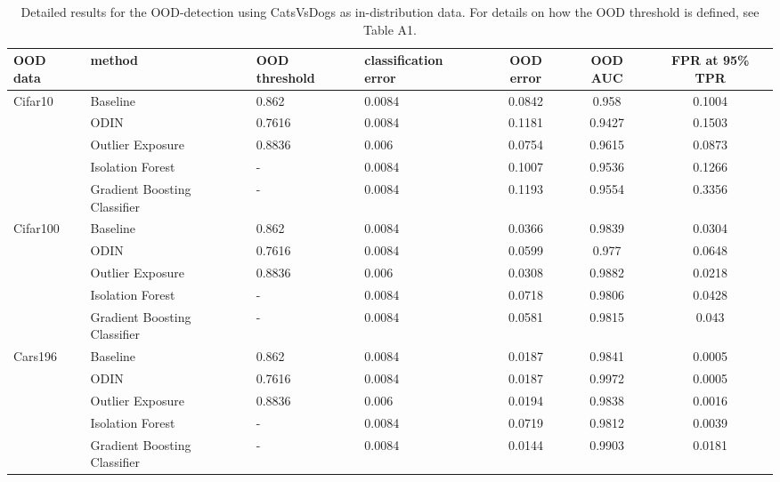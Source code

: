 \documentclass{article}
\begin{document}
 \begin{table}[h]
    \centering
    \caption{Detailed results for the OOD-detection using CatsVsDogs as in-distribution data. For details on how the OOD threshold is defined, see Table A1.}
\begin{tabular}{lllHccc}
\toprule
            OOD data & method                              & OOD threshold & classification error & OOD error & OOD AUC & FPR at 95\% TPR \\
\toprule
Cifar10 & Baseline &         0.862 &               0.0084 &    0.0842 &   0.958 &         0.1004 \\
            & ODIN &        0.7616 &               0.0084 &    0.1181 &  0.9427 &         0.1503 \\
            & Outlier Exposure &        0.8836 &                0.006 &    0.0754 &  0.9615 &         0.0873 \\
            & Isolation Forest &             - &               0.0084 &    0.1007 &  0.9536 &         0.1266 \\
            & Gradient Boosting Classifier &             - &               0.0084 &    0.1193 &  0.9554 &         0.3356 \\
\midrule
Cifar100 & Baseline &         0.862 &               0.0084 &    0.0366 &  0.9839 &         0.0304 \\
            & ODIN &        0.7616 &               0.0084 &    0.0599 &   0.977 &         0.0648 \\
            & Outlier Exposure &        0.8836 &                0.006 &    0.0308 &  0.9882 &         0.0218 \\
            & Isolation Forest &             - &               0.0084 &    0.0718 &  0.9806 &         0.0428 \\
            & Gradient Boosting Classifier &             - &               0.0084 &    0.0581 &  0.9815 &          0.043 \\
\midrule
Cars196 & Baseline &         0.862 &               0.0084 &    0.0187 &  0.9841 &         0.0005 \\
            & ODIN &        0.7616 &               0.0084 &    0.0187 &  0.9972 &         0.0005 \\
            & Outlier Exposure &        0.8836 &                0.006 &    0.0194 &  0.9838 &         0.0016 \\
            & Isolation Forest &             - &               0.0084 &    0.0719 &  0.9812 &         0.0039 \\
            & Gradient Boosting Classifier &             - &               0.0084 &    0.0144 &  0.9903 &         0.0181 \\

\end{tabular}
\end{table}
\end{document}
